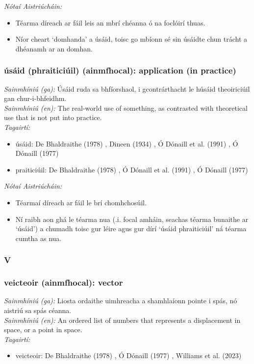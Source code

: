  \noindent \textit{Nótaí Aistriúcháin:}
\begin{itemize}
	\item Téarma díreach ar fáil leis an mbrí chéanna ó na foclóirí thuas.
	\item Níor cheart `domhanda' a úsáid, toisc go mbíonn sé sin úsáidte chun trácht a dhéanamh ar an domhan.
\end{itemize}


\subsubsection*{úsáid (phraiticiúil) (ainmfhocal): application (in practice)}
 \noindent \textit{Sainmhíniú (ga):} Úsáid ruda sa bhfíorshaol, i gcontrárthacht le húsáid theoiriciúil gan chur-i-bhfeidhm.
\\
 \noindent \textit{Sainmhíniú (en):} The real-world use of something, as contrasted with theoretical use that is not put into practice.
\\
 \noindent \textit{Tagairtí:}
\begin{itemize}
	\item úsáid: De Bhaldraithe (1978) \cite{de-bhaldraithe}, Dineen (1934) \cite{dineen}, Ó Dónaill et al. (1991) \cite{focloir-beag}, Ó Dónaill (1977) \cite{odonaill}
	\item praiticiúil: De Bhaldraithe (1978) \cite{de-bhaldraithe}, Ó Dónaill et al. (1991) \cite{focloir-beag}, Ó Dónaill (1977) \cite{odonaill}
\end{itemize}

 \noindent \textit{Nótaí Aistriúcháin:}
\begin{itemize}
	\item Téarmaí díreach ar fáil le brí chomhchosúil.
	\item Ní raibh aon ghá le téarma nua (.i. focal amháin, seachas téarma bunaithe ar `úsáid') a chumadh toisc gur léire agus gur dírí `úsáid phraiticiúil' ná téarma cumtha as nua.
\end{itemize}


 \subsubsection*{V}

\subsubsection*{veicteoir (ainmfhocal): vector}
 \noindent \textit{Sainmhíniú (ga):} Liosta ordaithe uimhreacha a shamhlaíonn pointe i spás, nó aistriú sa spás céanna.
\\
 \noindent \textit{Sainmhíniú (en):} An ordered list of numbers that represents a displacement in space, or a point in space.
\\
 \noindent \textit{Tagairtí:}
\begin{itemize}
	\item veicteoir: De Bhaldraithe (1978) \cite{de-bhaldraithe}, Ó Dónaill (1977) \cite{odonaill}, Williams et al. (2023) \cite{storchiste}
\end{itemize}

